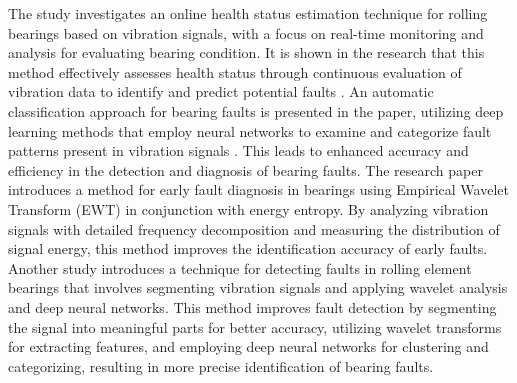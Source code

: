 \documentclass[sn-basic,pdflatex]{sn-jnl}
\theoremstyle{remark}
\theoremstyle{definition}
\begin{document}
The study investigates an online health status estimation technique for
rolling bearings based on vibration signals, with a focus on real-time
monitoring and analysis for evaluating bearing condition. It is shown in
the research that this method effectively assesses health status through
continuous evaluation of vibration data to identify and predict
potential faults \citep{WOS:000452922000015}. An automatic
classification approach for bearing faults is presented in the paper,
utilizing deep learning methods that employ neural networks to examine
and categorize fault patterns present in vibration signals
\citep{WOS:000453413600001}. This leads to enhanced accuracy and
efficiency in the detection and diagnosis of bearing faults. The
research paper \citep{WOS:000452819600235} introduces a method for early
fault diagnosis in bearings using Empirical Wavelet Transform (EWT) in
conjunction with energy entropy. By analyzing vibration signals with
detailed frequency decomposition and measuring the distribution of
signal energy, this method improves the identification accuracy of early
faults. Another study \citep[@WOS:000449334500118]{WOS:000450745100001}
introduces a technique for detecting faults in rolling element bearings
that involves segmenting vibration signals and applying wavelet analysis
and deep neural networks. This method improves fault detection by
segmenting the signal into meaningful parts for better accuracy,
utilizing wavelet transforms for extracting features, and employing deep
neural networks for clustering and categorizing, resulting in more
precise identification of bearing faults.
\end{document}
